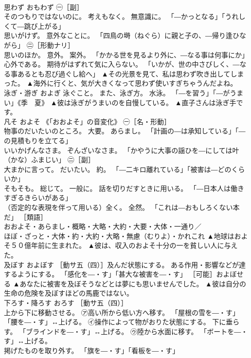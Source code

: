 \documentclass[8pt]{extreport}
\begin{document}
\begin{CJK}{UTF8}{min}
\\	思わず	おもわず	㊀［副］ 
\\	そのつもりではないのに。 考えもなく。 無意識に。 「―かっとなる」「うれしくて―跳び上がる」 
\\	思いがけず。 意外なことに。 「四鳥の塒（ねぐら）に親と子の、―帰り逢ひながら」 ㊁［形動ナリ］ 
\\	思いのほか。 意外。 案外。 「かかる世を見るより外に、―なる事は何事にか」 
\\	心外である。 期待がはずれて気に入らない。 「いかが、世の中さびしく、―なる事あるとも忍び過ぐし給へ」	▲その光景を見て、私は思わず吹き出してしまった。 ▲海外に行くと、気が大きくなって思わず使いすぎちゃうんだよね。
\\	泳ぎ・游ぎ	およぎ	泳ぐこと。 また、泳ぎ方。 水泳。 「―を習う」「―がうまい」《季　夏》	▲彼は泳ぎがうまいのを自慢している。 ▲直子さんは泳ぎ手です。
\\	凡そ	およそ	《「おおよそ」の音変化》 ㊀［名・形動］ 
\\	物事のだいたいのところ。 大要。 あらまし。 「計画の―は承知している」「―の見積もりを立てる」 
\\	いいかげんなさま。 ぞんざいなさま。 「かやうに大事の謡ひを―にしては叶（かな）ふまじい」 ㊁［副］ 
\\	大まかに言って。 だいたい。 約。 「―二キロ離れている」「被害は―どのくらいか」 
\\	そもそも。 総じて。 一般に。 話を切りだすときに用いる。 「―日本人は働きすぎるきらいがある」 
\\	（否定的な表現を伴って用いる）全く。 全然。 「これは―おもしろくない本だ」 ［類語］ 
\\	おおよそ・あらまし・概略・大略・大約・大要・大体・一通り／ 
\\	ほぼ・ざっと・大体・約・大約・大略・無慮（むりよ）・かれこれ	▲地球はおよそ５０億年前に生まれた。 ▲彼は、収入のおよそ十分の一を貧しい人に与えた。
\\	及ぼす	およぼす	［動サ五（四）］及んだ状態にする。 ある作用・影響などが達するようにする。 「感化を―・す」「甚大な被害を―・す」 ［可能］およぼせる	▲あなたに被害を及ぼそうなどとは夢にも思いませんでした。 ▲彼は自分の生命の危険を及ぼすほどの馬鹿ではない。
\\	下ろす・降ろす	おろす	［動サ五（四）］ 
\\	上から下に移動させる。 ㋐高い所から低い方へ移す。 「屋根の雪を―・す」「腰を―・す」↔上げる。 ㋑操作によって物がおりた状態にする。 下に垂らす。 「ブラインドを―・す」↔上げる。 ㋒陸から水面に移す。 「ボートを―・す」↔上げる。 
\\	掲げたものを取り外す。 「旗を―・す」「看板を―・す」 

\end{CJK}
\end{document}
